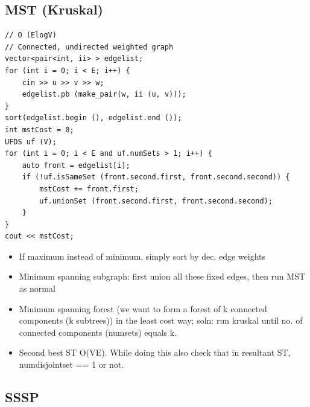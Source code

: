 \documentclass[8pt, a4paper, oneside, twocolumn]{extarticle}
\begin{document}
\subsection{MST (Kruskal)}
\begin{verbatim}
// O (ElogV)
// Connected, undirected weighted graph
vector<pair<int, ii> > edgelist;
for (int i = 0; i < E; i++) {
    cin >> u >> v >> w;
    edgelist.pb (make_pair(w, ii (u, v)));
}
sort(edgelist.begin (), edgelist.end ());
int mstCost = 0;
UFDS uf (V);
for (int i = 0; i < E and uf.numSets > 1; i++) {
    auto front = edgelist[i];
    if (!uf.isSameSet (front.second.first, front.second.second)) {
        mstCost += front.first;
        uf.unionSet (front.second.first, front.second.second);
    }
}
cout << mstCost;
\end{verbatim}
\begin{itemize}
    \item If maximum instead of minimum, simply sort by dec. edge weights
    \item Minimum spanning subgraph: first union all these fixed edges, then run MST as normal
    \item Minimum spanning forest (we want to form a forest of k connected components (k subtrees)) in the least cost way; soln: run kruskal until no. of connected components (numsets) equals k.
    \item Second best ST O(VE). While doing this also check that in resultant ST, numdisjointset == 1 or not.
\end{itemize}
\subsection{SSSP}
\end{document}
